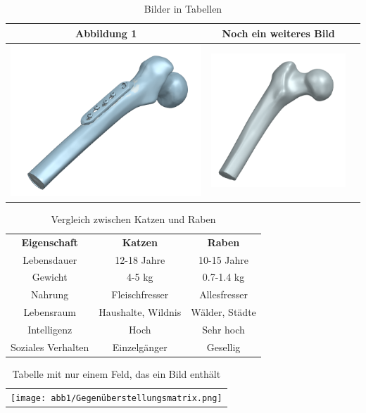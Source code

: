 \begin{table}[H]
    \centering
    \caption{Bilder in Tabellen}
    \begin{tabular}{c c c}
        \hline
        \textbf{Abbildung 1} & \textbf{Noch ein weiteres Bild} \\
        \hline
            \includegraphics[width=0.2\linewidth]{abb1/Impl_2_3D_Scan.png} & \includegraphics[width=0.2\linewidth]{abb1/Femur_oben_GOM.png} \\ 
        \hline
    \end{tabular}
    \label{BilderTab}
\end{table}


\begin{table}[H]
    \centering
    \caption{Vergleich zwischen Katzen und Raben}
    \begin{tabular}{ c c c }
        \textbf{Eigenschaft} & \textbf{Katzen} & \textbf{Raben} \\
        Lebensdauer & 12-18 Jahre & 10-15 Jahre \\
        Gewicht & 4-5 kg & 0.7-1.4 kg \\
        Nahrung & Fleischfresser & Allesfresser \\
        Lebensraum & Haushalte, Wildnis & Wälder, Städte \\
        Intelligenz & Hoch & Sehr hoch \\
        Soziales Verhalten & Einzelgänger & Gesellig \\
    \end{tabular}
    \label{ohneRahmenTab}
\end{table}


\begin{table}[H]
    \centering
    \caption{Tabelle mit nur einem Feld, das ein Bild enthält}
    \begin{tabular}{c}
        \texttt{[image: abb1/Gegenüberstellungsmatrix.png]} %
    \end{tabular}
    \label{tab:einBild}
\end{table}



